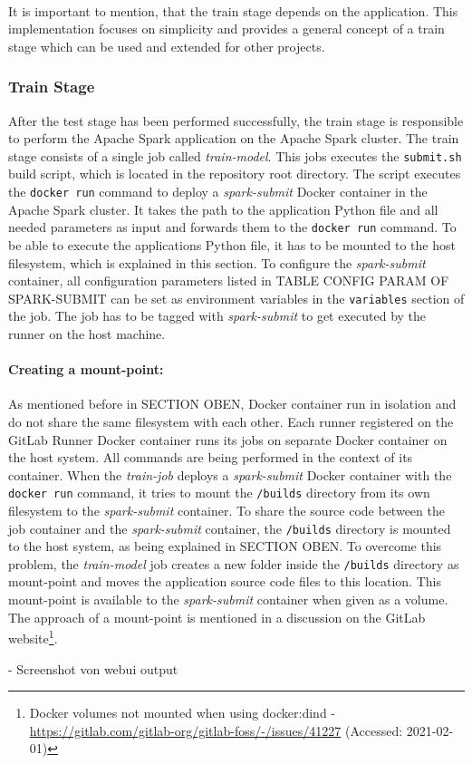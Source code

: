 \paragraph{}
It is important to mention, that the train stage depends on the application. This implementation focuses on simplicity and provides a general concept of a train stage which can be used and extended for other projects.


\subsubsection{Train Stage}
After the test stage has been performed successfully, the train stage is responsible to perform the Apache Spark application on the Apache Spark cluster.
The train stage consists of a single job called \textit{train-model}.
This jobs executes the \texttt{submit.sh} build script, which is located in the repository root directory. The script executes the \texttt{docker run} command to deploy a \textit{spark-submit} Docker container in the Apache Spark cluster. It takes the path to the application Python file and all needed parameters as input and forwards them to the \texttt{docker run} command. To be able to execute the applications Python file, it has to be mounted to the host filesystem, which is explained in this section.
To configure the \textit{spark-submit} container, all configuration parameters listed in TABLE CONFIG PARAM OF SPARK-SUBMIT can be set as environment variables in the \texttt{variables} section of the job.
The job has to be tagged with \textit{spark-submit} to get executed by the runner on the host machine.


\paragraph{Creating a mount-point:}
As mentioned before in SECTION OBEN, Docker container run in isolation and do not share the same filesystem with each other.
Each runner registered on the GitLab Runner Docker container runs its jobs on separate Docker container on the host system. All commands are being performed in the context of its container.
%
When the \textit{train-job} deploys a \textit{spark-submit} Docker container with the \texttt{docker run} command, it tries to mount the \texttt{/builds} directory from its own filesystem to the \textit{spark-submit} container.
%
To share the source code between the job container and the \textit{spark-submit} container, the \texttt{/builds} directory is mounted to the host system, as being explained in SECTION OBEN.
%
To overcome this problem, the \textit{train-model} job creates a new folder inside the \texttt{/builds} directory as mount-point and moves the application source code files to this location.
%
This mount-point is available to the \textit{spark-submit} container when given as a volume.
%
The approach of a mount-point is mentioned in a discussion on the GitLab website\footnote{Docker volumes not mounted when using docker:dind - \url{https://gitlab.com/gitlab-org/gitlab-foss/-/issues/41227} (Accessed: 2021-02-01)}.

- Screenshot von webui output
